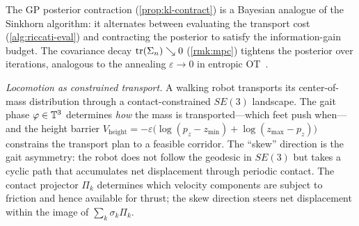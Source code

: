 The GP posterior contraction (\cref{prop:kl-contract}) is a
Bayesian analogue of the Sinkhorn algorithm: it alternates between
evaluating the transport cost (\cref{alg:riccati-eval}) and
contracting the posterior to satisfy the information-gain budget.
The covariance decay $\operatorname{tr}(\Sigma_n) \searrow 0$
(\cref{rmk:mpc}) tightens the posterior over iterations,
analogous to the annealing $\varepsilon \to 0$ in entropic
OT~\cite{Villani}.

\emph{Locomotion as constrained transport.}
A walking robot transports its center-of-mass distribution through a
contact-constrained $SE(3)$ landscape.
The gait phase $\varphi \in \mathbb{T}^3$ determines \emph{how} the mass is
transported---which feet push when---and the height barrier
$V_{\mathrm{height}} = -\varepsilon\bigl(\log(p_z - z_{\min})
  + \log(z_{\max} - p_z)\bigr)$
constrains the transport plan to a feasible corridor.
The ``skew'' direction is the gait asymmetry:
the robot does not follow the geodesic in $SE(3)$ but takes a cyclic path
that accumulates net displacement through periodic contact.
The contact projector $\Pi_k$ determines which velocity components
are subject to friction and hence available for thrust; the skew
direction steers net displacement within the image of
$\sum_k \sigma_k \Pi_k$.

